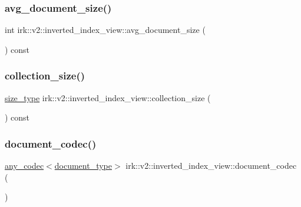 \subsubsection{\texorpdfstring{avg\+\_\+document\+\_\+size()}{avg\_document\_size()}}
{\footnotesize\ttfamily int irk\+::v2\+::inverted\+\_\+index\+\_\+view\+::avg\+\_\+document\+\_\+size (\begin{DoxyParamCaption}{ }\end{DoxyParamCaption}) const\hspace{0.3cm}{\ttfamily [inline]}}

\mbox{\label{classirk_1_1v2_1_1inverted__index__view_a2b00000b6c8ccb6acb487494d6d0093b}} 
\subsubsection{\texorpdfstring{collection\+\_\+size()}{collection\_size()}}
{\footnotesize\ttfamily \mbox{\hyperlink{classirk_1_1v2_1_1inverted__index__view_aebba8b75ebd7b14d546a29fe925352d6}{size\+\_\+type}} irk\+::v2\+::inverted\+\_\+index\+\_\+view\+::collection\+\_\+size (\begin{DoxyParamCaption}{ }\end{DoxyParamCaption}) const\hspace{0.3cm}{\ttfamily [inline]}}

\mbox{\label{classirk_1_1v2_1_1inverted__index__view_aaa1f3b7660025d60cdb815268d56334c}} 
\subsubsection{\texorpdfstring{document\+\_\+codec()}{document\_codec()}}
{\footnotesize\ttfamily \mbox{\hyperlink{namespaceirk_a831a3a869cf19601dbfb5c41765a2e87}{any\+\_\+codec}}$<$\mbox{\hyperlink{classirk_1_1v2_1_1inverted__index__view_a8441dcf60be934782fdaa9411723700b}{document\+\_\+type}}$>$ irk\+::v2\+::inverted\+\_\+index\+\_\+view\+::document\+\_\+codec (\begin{DoxyParamCaption}{ }\end{DoxyParamCaption})\hspace{0.3cm}{\ttfamily [inline]}}

